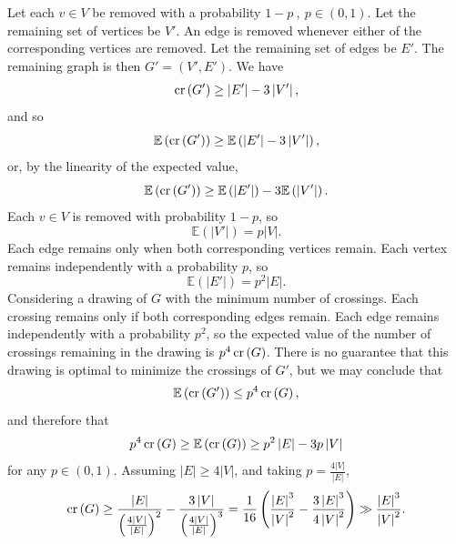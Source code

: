 \documentclass[12pt]{amsart}
\begin{document}
Let each \(v \in V\) be
removed with a probability \(1-p~,~  p \in (0,1)\). Let the remaining set of vertices be \(V'\). An edge is
removed whenever either of the corresponding vertices are removed. Let the remaining set of edges be \(E'\). The remaining graph is then
\(G' = (V',E')\). We have
\[
    \operatorname{cr}\left( G' \right) \geq \left\lvert E' \right\rvert - 3 \left\lvert V' \right\rvert 
,\]
and so
\[
    \mathbb{E} \left( \operatorname{cr}\left( G' \right)  \right) \geq \mathbb{E} \left( \left\lvert E' \right\rvert - 3 \left\lvert V' \right\rvert  \right) 
,\]
or, by the linearity of the expected value,
\[
    \mathbb{E} \left( \operatorname{cr}\left( G' \right)  \right) \geq \mathbb{E} \left( \left\lvert E' \right\rvert  \right) - 3 \mathbb{E} \left( \left\lvert V' \right\rvert  \right)    
.\]
Each \(v \in V\) is removed with probability \(1-p\), so
\[
    \mathbb{E} \left( \left\lvert V' \right\rvert  \right) = p \left\lvert V \right\rvert 
.\]
Each edge remains only when both corresponding vertices remain. Each vertex remains
independently with a probability \(p\), so 
\[
    \mathbb{E} \left( \left\lvert E' \right\rvert  \right) = p^{2}\left\lvert E \right\rvert 
.\]
Considering a drawing of \(G\) with the minimum number of crossings. Each crossing remains
only if both corresponding edges remain. Each edge remains independently with a probability
\(p^{2}\), so the expected value of the number of crossings remaining in the drawing is \(p^{4} \operatorname{cr}\left( G \right) \).
There is no guarantee that this drawing is optimal to minimize the crossings of \(G'\), but we may conclude that
\[
    \mathbb{E} \left( \operatorname{cr}\left( G' \right)  \right) \leq p ^{4} \operatorname{cr}\left( G \right)
,\]
and therefore that
\[
    p^{4} \operatorname{cr}\left( G \right) \geq \mathbb{E} \left( \operatorname{cr}\left( G \right)  \right) \geq p^{2} \left\lvert E \right\rvert - 3 p \left\lvert V \right\rvert 
\]
for any \(p \in (0,1)\). Assuming \(\left\lvert E \right\rvert \geq 4\left\lvert V \right\rvert \), and taking \(p = \frac{4\left\lvert V \right\rvert }{\left\lvert E \right\rvert }\),
\[
    \operatorname{cr}\left( G \right) \geq \frac{\left\lvert E \right\rvert }{\left( \frac{4 \left\lvert V \right\rvert }{\left\lvert E \right\rvert }   \right)^{2} } - \frac{3 \left\lvert V \right\rvert }{\left( \frac{4 \left\lvert V \right\rvert }{\left\lvert E \right\rvert }  \right) ^{3} } = \frac{1}{16} \left( \frac{\left\lvert E \right\rvert ^{3} }{\left\lvert V \right\rvert ^{2}} - \frac{3 \left\lvert E \right\rvert ^{3} }{4 \left\lvert V \right\rvert ^{2}}  \right) \gg \frac{\left\lvert E \right\rvert ^{3} }{\left\lvert V \right\rvert ^{2}}
.\]
\end{document}
